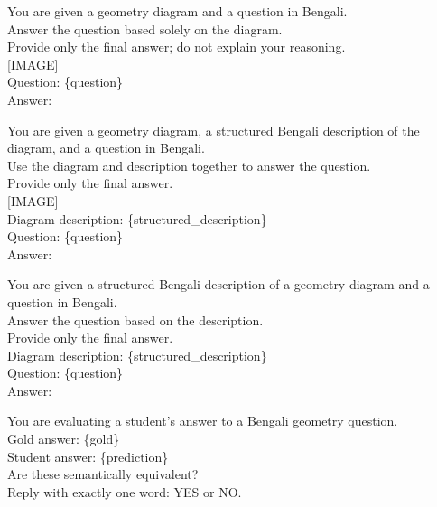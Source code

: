 \documentclass[11pt]{article}
\begin{document}
\begin{tcolorbox}[colback=blue!5, colframe=blue!40!black, title=Phase A: Diagram Only, fonttitle=\bfseries]
\small
\ttfamily
You are given a geometry diagram and a question in Bengali.\\
Answer the question based solely on the diagram.\\
Provide only the final answer; do not explain your reasoning.\\
{[}IMAGE{]}\\
Question: \{question\}\\
Answer:
\end{tcolorbox}

\begin{tcolorbox}[colback=green!5, colframe=green!35!black, title=Phase B: Diagram + Description, fonttitle=\bfseries]
\small
\ttfamily
You are given a geometry diagram, a structured Bengali description of the diagram, and a question in Bengali.\\
Use the diagram and description together to answer the question.\\
Provide only the final answer.\\
{[}IMAGE{]}\\
Diagram description: \{structured\_description\}\\
Question: \{question\}\\
Answer:
\end{tcolorbox}

\begin{tcolorbox}[colback=orange!5, colframe=orange!45!black, title=Phase C: Description Only, fonttitle=\bfseries]
\small
\ttfamily
You are given a structured Bengali description of a geometry diagram and a question in Bengali.\\
Answer the question based on the description.\\
Provide only the final answer.\\
Diagram description: \{structured\_description\}\\
Question: \{question\}\\
Answer:
\end{tcolorbox}

\begin{tcolorbox}[colback=purple!5, colframe=purple!40!black, title=LLM Judge, fonttitle=\bfseries]
\small
\ttfamily
You are evaluating a student's answer to a Bengali geometry question.\\
Gold answer: \{gold\}\\
Student answer: \{prediction\}\\
Are these semantically equivalent?\\
Reply with exactly one word: YES or NO.
\end{tcolorbox}
\end{document}
